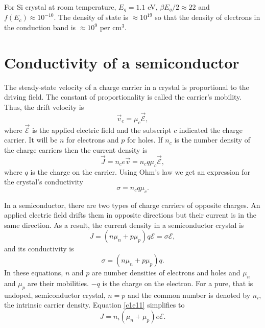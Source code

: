 For Si crystal at room temperature, $E_g = 1.1$ eV, $\beta E_g/2 \approx 22$
and $f(E_c) \approx 10^{-10}$. The density of state is $\approx 10^{19}$ so that
the density of electrons in the conduction band is $\approx 10^9$ per cm$^3$.

\section{Conductivity of a semiconductor}\label{c1s3}
The steady-state velocity of a charge carrier in a crystal is proportional to
the driving field. The constant of proportionality is called the carrier's
mobility. Thus, the drift velocity is
\begin{equation}\label{c1e8}
\vec{v}_c = \mu_c\vec{\mathcal{E}},
\end{equation}
where $\vec{\mathcal{E}}$ is the applied electric field and the subscript $c$
indicated the charge carrier. It will be $n$ for electrons and $p$ for holes.
If $n_c$ is the number density of the charge carriers then the current density 
is
\begin{equation}\label{c1e9}
\vec{J} = n_ce\vec{v} = n_cq\mu_c\vec{\mathcal{E}},
\end{equation}
where $q$ is the charge on the carrier. Using Ohm's law we get an expression 
for the crystal's conductivity
\begin{equation}\label{c1e10}
\sigma = n_cq\mu_c.
\end{equation}

In a semiconductor, there are two types of charge carriers of opposite charges.
An applied electric field drifts them in opposite directions but their current
is in the same direction. As a result, the current density in a semiconductor
crystal is
\begin{equation}\label{c1e11}
J = (n\mu_n + p\mu_p)q\mathcal{E} = \sigma\mathcal{E},
\end{equation}
and its conductivity is
\begin{equation}\label{c1e12}
\sigma = (n\mu_n + p\mu_p)q.
\end{equation}
In these equations, $n$ and $p$ are number densities of electrons and holes and
$\mu_n$ and $\mu_p$ are their mobilities. $-q$ is the charge on the electron.
For a pure, that is undoped, semiconductor crystal, $n = p$ and the common
number is denoted by $n_i$, the intrinsic carrier density. Equation 
\eqref{c1e11} simplifies to
\begin{equation}\label{c1e13}
J = n_i(\mu_n + \mu_p)e\mathcal{E}.
\end{equation}

